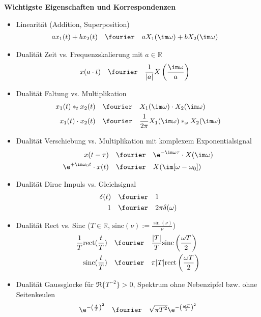 \noindent \textbf{Wichtigste Eigenschaften und Korrespondenzen}
\begin{itemize}
\item Linearität (Addition, Superposition)
\begin{align}
a x_1(t) + b x_2(t) &\quad \fourier \quad a X_1(\im\omega) + b X_2(\im\omega)
\end{align}

\item Dualität Zeit vs. Frequenzskalierung mit $a\in\mathbb{R}$
\begin{align}
x(a \cdot t) &\quad \fourier \quad \frac{1}{|a|}X\left(\frac{\im\omega}{a}\right)
\end{align}

\item Dualität Faltung vs. Multiplikation
\begin{align}
x_1(t) \ast_t x_2(t) &\quad \fourier \quad X_1(\im\omega) \cdot X_2(\im\omega)\\
x_1(t) \cdot x_2(t) &\quad \fourier \quad \frac{1}{2\pi} X_1(\im\omega) \ast_\omega X_2(\im\omega)
\end{align}

\item Dualität Verschiebung vs. Multiplikation mit komplexem Exponentialsignal
\begin{align}
x(t-\tau) &\quad \fourier \quad \e^{-\im\omega\tau} \cdot X(\im\omega)\\
\e^{+\im\omega_0 t} \cdot x(t) &\quad \fourier \quad X(\im[\omega-\omega_0])
\end{align}

\item Dualität Dirac Impuls vs. Gleichsignal
\begin{align}
\delta(t) &\quad \fourier \quad 1\\
1 &\quad \fourier \quad 2\pi\delta(\omega)
\end{align}

\item Dualität Rect vs. Sinc ($T\in\mathbb{R}$, $\mathrm{sinc}(\nu) := \frac{\sin(\nu)}{\nu}$)
\begin{align}
\frac{1}{T} \mathrm{rect}(\frac{t}{T}) &\quad \fourier \quad \frac{|T|}{T} \mathrm{sinc}\left(\frac{\omega T}{2}\right)\\
\mathrm{sinc}(\frac{t}{T}) &\quad \fourier \quad \pi |T| \mathrm{rect}\left(\frac{\omega T}{2}\right)
\end{align}

\item Dualität Gaussglocke für $\Re\{T^{-2}\}>0$, Spektrum ohne Nebenzipfel bzw. ohne Seitenkeulen
\begin{align}
\e^{-\left(\frac{t}{T}\right)^2} \quad \fourier \quad \sqrt{\pi T^2} \e^{-\left(\frac{\omega T}{2}\right)^2}
\end{align}



\end{itemize}
